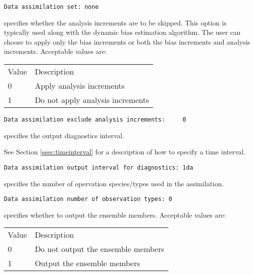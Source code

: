  \begin{Verbatim}[frame=single]
Data assimilation set: none
 \end{Verbatim}

 

  specifies whether
 the analysis increments
 are to be skipped. This option is typically used along with the dynamic
 bias estimation algorithm. The user can choose to apply only the bias
 increments or both the bias increments and analysis increments. 
 Acceptable values are:

 \begin{tabular}{ll}
 Value & Description                                       \\
 0     &  Apply analysis increments                        \\
 1     &  Do not apply analysis increments                 \\
 \end{tabular}
 

 \begin{Verbatim}[frame=single]
Data assimilation exclude analysis increments:     0
 \end{Verbatim}

 
  specifies
 the output diagnostics interval.

 See Section \ref{ssec:timeinterval} for a description
 of how to specify a time interval.
 

 \begin{Verbatim}[frame=single]
Data assimilation output interval for diagnostics: 1da
 \end{Verbatim}

 
  specifies the
 number of opervation species/types used in the assimilation.
 

 \begin{Verbatim}[frame=single]
Data assimilation number of observation types: 0
 \end{Verbatim}

 
  specifies whether
 to output the ensemble members.
 Acceptable values are:

 \begin{tabular}{ll}
 Value & Description                         \\
 0     &  Do not output the ensemble members \\
 1     &  Output the ensemble members        \\
 \end{tabular}
 

